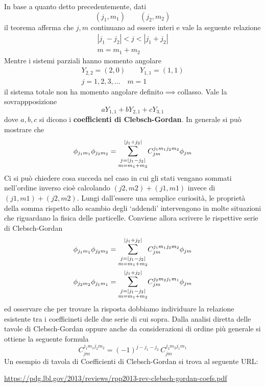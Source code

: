 In base a quanto detto precedentemente, dati \[
	(j_{1},m_{1}) \qquad (j_{2},m_{2})
\]
il teorema afferma che \(j,m\) continuano ad essere interi e vale la
seguente relazione \begin{gather*}
	| j_{1} - j_{2}| < j < | j_{1} + j_{2} |\\
	m = m_{1} + m_{2}
\end{gather*}
Mentre i sistemi parziali hanno momento angolare \begin{gather*}
	Y_{2,2}=(2,0) \qquad Y_{1,1}=(1,1)\\
	j = 1,2,3, \dots \quad m = 1
\end{gather*}
il sistema totale non ha momento angolare definito\(\implies\)collasso.
Vale la sovrappposizione \[
	a Y_{1,1}+bY_{2,1}+cY_{3,1}
\] dove \(a,b,c\) si dicono i \textbf{coefficienti di Clebsch-Gordan}.
In generale si può mostrare che
\[
	\phi_{j_{1}m_{1}} \phi_{j_{2}m_{2}} = \mathlarger{\sum}_{\substack{j=| j_{1}-j_{2}| \\ m = m_{1}+m_{2}} }^{| j_{1}+j_{2}|} C_{jm}^{j_{1}m_{1}j_{2}m_{2}} \phi_{jm}
\]
Ci si può chiedere cosa succeda nel caso in cui gli stati vengano sommati nell’ordine inverso cioè calcolando
$(j2, m2) + (j1, m1)$ invece di $(j1, m1) + (j2, m2)$.
Lungi dall’essere una semplice curiosità, le proprietà della somma rispetto allo scambio degli ‘addendi’ intervengono in molte situazioni che
riguardano la fisica delle particelle.
Conviene allora scrivere le rispettive serie di Clebsch-Gordan
\begin{gather*}
    \phi_{j_{1}m_{1}} \phi_{j_{2}m_{2}} = \mathlarger{\sum}_{\substack{j=| j_{1}-j_{2}| \\ m = m_{1}+m_{2}} }^{| j_{1}+j_{2}|} C_{jm}^{j_{1}m_{1}j_{2}m_{2}} \phi_{jm}\\
	\phi_{j_{2}m_{2}} \phi_{j_{1}m_{1}} = \mathlarger{\sum}_{\substack{j=| j_{1}-j_{2}| \\ m = m_{1}+m_{2}} }^{| j_{1}+j_{2}|} C_{jm}^{j_{2}m_{2}j_{1}m_{1}} \phi_{jm}
\end{gather*}
ed osservare che per trovare la risposta dobbiamo individuare la relazione esistente tra i coefficineti delle due serie di cui sopra.
Dalla analisi diretta delle tavole di Clebsch-Gordan oppure anche da considerazioni di ordine più generale si ottiene la seguente formula
\[
	C_{jm}^{j_{1}m_{1}j_{2}m_{2}} = (-1)^{j-j_1-j_2} \, C_{jm}^{j_{2}m_{2}j_{1}m_{1}}
\]
Un esempio di tavola di Coefficienti di Clebsch-Gordan si trova al seguente URL:
\begin{center}
	\url{https://pdg.lbl.gov/2013/reviews/rpp2013-rev-clebsch-gordan-coefs.pdf}
\end{center}

